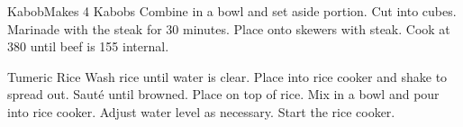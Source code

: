 \documentclass[]{article}
\title{}
\author{}
\begin{document}
\begin{recipe}{Kabob}{}{Makes 4 Kabobs}
	Combine in a bowl and set aside portion. 
	Cut into cubes.
	Marinade with the steak for 30 minutes. Place onto skewers with steak. Cook at 380 until beef is 155 internal. 
\end{recipe}

\begin{recipe}{Tumeric Rice}{}{}
	Wash rice until water is clear. Place into rice cooker and shake to spread out.
	Sauté until browned. Place on top of rice. 
	Mix in a bowl and pour into rice cooker. Adjust water level as necessary. Start the rice cooker.
\end{recipe}
\end{document}
